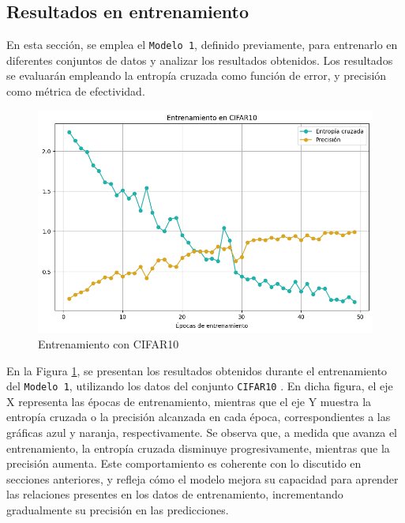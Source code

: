 \subsection{Resultados en entrenamiento}

En esta sección, se emplea el \texttt{Modelo 1}, definido previamente, para entrenarlo en diferentes conjuntos de datos y analizar los resultados obtenidos. Los resultados se evaluarán empleando la entropía cruzada como función de error, y precisión como métrica de efectividad.

\begin{figure}[H]
	\centering
	\includegraphics[scale=0.5]{imagenes/cifar10.png}  
	\caption{Entrenamiento con CIFAR10}
	\label{fig:cifar10}
\end{figure}

En la Figura \ref{fig:cifar10}, se presentan los resultados obtenidos durante el entrenamiento del \texttt{Modelo 1}, utilizando los datos del conjunto \texttt{CIFAR10} \cite{cifar10}. En dicha figura, el eje X representa las épocas de entrenamiento, mientras que el eje Y muestra la entropía cruzada o la precisión alcanzada en cada época, correspondientes a las gráficas azul y naranja, respectivamente. Se observa que, a medida que avanza el entrenamiento, la entropía cruzada disminuye progresivamente, mientras que la precisión aumenta. Este comportamiento es coherente con lo discutido en secciones anteriores, y refleja cómo el modelo mejora su capacidad para aprender las relaciones presentes en los datos de entrenamiento, incrementando gradualmente su precisión en las predicciones. 

